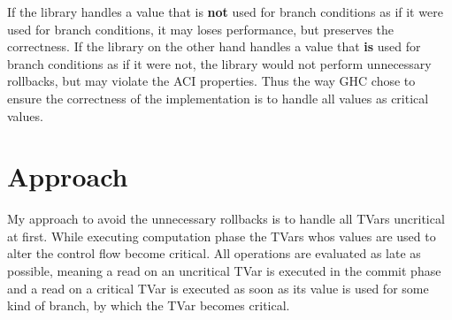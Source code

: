 If the library handles a value that is \textbf{not} used for branch conditions as if it were used for branch conditions, 
it may loses performance, but preserves the correctness. If the library on the other hand handles a value that \textbf{is}
used for branch conditions as if it were not, the library would not perform unnecessary rollbacks, but may violate 
the ACI properties. Thus the way GHC chose to ensure the correctness of the implementation is to handle all values as 
critical values.  

\section{Approach}
My approach to avoid the unnecessary rollbacks is to handle all TVars uncritical at first. While executing computation 
phase the TVars whos values are used to alter the control flow become critical. All  operations are
evaluated as late as possible, meaning a read on an uncritical TVar is executed in the commit phase and a read on 
a critical TVar is executed as soon as its value is used for some kind of branch, by which the TVar becomes critical.

